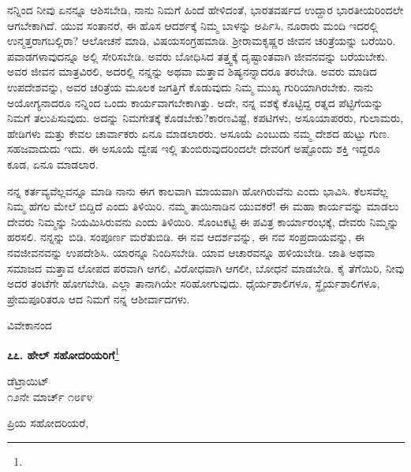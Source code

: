 ನನ್ನಿಂದ ನೀವು ಏನನ್ನೂ ಆಶಿಸಬೇಡಿ, ನಾನು ನಿಮಗೆ ಹಿಂದೆ ಹೇಳಿದಂತೆ, ಭಾರತವರ್ಷದ ಉದ್ದಾರ ಭಾರತೀಯರಿಂದಲೇ ಆಗಬೇಕಾಗಿದೆ. ಯುವ ಸಂತಾನರೆ, ಈ ಹೊಸ ಆದರ್ಶಕ್ಕೆ ನಿಮ್ಮ ಬಾಳನ್ನು ಅರ್ಪಿಸಿ. ನೂರಾರು ಮಂದಿ ಇದರಲ್ಲಿ ಉನ್ಮತ್ತರಾಗಬಲ್ಲಿರಾ? ಆಲೋಚನೆ ಮಾಡಿ, ವಿಷಯಸಂಗ್ರಹಮಾಡಿ. ಶ‍್ರೀರಾಮಕೃಷ್ಣರ ಜೀವನ ಚರಿತ್ರೆಯನ್ನು ಬರೆಯಿರಿ. ಪವಾಡಗಳಾವುದನ್ನೂ ಅಲ್ಲಿ ಸೇರಿಸಬೇಡಿ. ಅವರು ಬೋಧಿಸಿದ ತತ್ತ್ವಕ್ಕೆ ದೃಷ್ಟಾಂತವಾಗಿ ಜೀವನವನ್ನು ಬರೆಯಬೇಕು. ಅವರ ಜೀವನ ಮಾತ್ರವಿರಲಿ, ಅದರಲ್ಲಿ ನನ್ನನ್ನು ಅಥವಾ ಮತ್ತಾವ ಶಿಷ್ಯನನ್ನಾದರೂ ತರಬೇಡಿ. ಅವರು ಮಾಡಿದ ಉಪದೇಶವನ್ನು, ಅವರ ಚರಿತ್ರೆಯ ಮೂಲಕ ಜಗತ್ತಿಗೆ ಕೊಡುವುದು ನಿಮ್ಮ ಮುಖ್ಯ ಗುರಿಯಾಗಿರಬೇಕು. ನಾನು ಅಯೋಗ್ಯನಾದರೂ ನನ್ನಿಂದ ಒಂದು ಕಾರ್ಯವಾಗಬೇಕಾಗಿತ್ತು. ಅದೇ, ನನ್ನ ವಶಕ್ಕೆ ಕೊಟ್ಟಿದ್ದ ರತ್ನದ ಪೆಟ್ಟಿಗೆಯನ್ನು ನಿಮಗೆ ತಲುಪಿಸುವುದು. ಅದನ್ನು ನಿಮಗೇತಕ್ಕೆ ಕೊಡಬೇಕು?ಕಾರಣವಿಷ್ಟೆ, ಕಪಟಿಗಳು, ಅಸೂಯಾಪರರು, ಗುಲಾಮರು, ಹೇಡಿಗಳು ಮತ್ತು ಕೇವಲ ಚಾರ್ವಾಕರು ಏನೂ ಮಾಡಲಾರರು. ಅಸೂಯೆ ಎಂಬುದು ನಮ್ಮ ದೇಶದ ಹುಟ್ಟು ಗುಣ. ಸಹಜವಾದುದು ಇದು. ಈ ಅಸೂಯೆ ದ್ವೇಷ ಇಲ್ಲಿ ತುಂಬಿರುವುದರಿಂದಲೇ ದೇವರಿಗೆ ಅಷ್ಟೊಂದು ಶಕ್ತಿ ಇದ್ದರೂ ಕೂಡ, ಏನೂ ಮಾಡಲಾರ.

\vspace{0.2cm}

ನನ್ನ ಕರ್ತವ್ಯವೆಲ್ಲವನ್ನೂ ಮಾಡಿ ನಾನು ಈಗ ಕಾಲವಾಗಿ ಮಾಯವಾಗಿ ಹೋಗಿರುವೆನು ಎಂದು ಭಾವಿಸಿ. ಕೆಲಸವೆಲ್ಲ ನಿಮ್ಮ ಹೆಗಲ ಮೇಲೆ ಬಿದ್ದಿದೆ ಎಂದು ತಿಳಿಯಿರಿ. ನಮ್ಮ ತಾಯಿನಾಡಿನ ಯುವಕರೆ! ಈ ಮಹಾ ಕಾರ್ಯವನ್ನು ಮಾಡಲು ದೇವರು ನಿಮ್ಮನ್ನು ನಿಯಮಿಸಿರುವನು ಎಂದು ತಿಳಿಯಿರಿ. ಸೊಂಟಕಟ್ಟಿ ಈ ಪವಿತ್ರ ಕಾರ್ಯಾರಂಭಕ್ಕೆ, ದೇವರು ನಿಮ್ಮನ್ನು ಹರಸಲಿ. ನನ್ನನ್ನು ಬಿಡಿ. ಸಂಪೂರ್ಣ ಮರೆತುಬಿಡಿ. ಈ ನವ ಆದರ್ಶವನ್ನು, ಈ ನವ ಸಂಪ್ರದಾಯವನ್ನು, ಈ ನವಜೀವನವನ್ನು ಉಪದೇಶಿಸಿ. ಯಾರನ್ನೂ ನಿಂದಿಸಬೇಡಿ. ಯಾವ ಆಚಾರವನ್ನೂ ಹಳಿಯಬೇಡಿ. ಜಾತಿ ಅಥವಾ ಸಮಾಜದ ಮತ್ತಾವ ಲೋಪದ ಪರವಾಗಿ ಆಗಲಿ, ವಿರೋಧವಾಗಿ ಆಗಲೀ, ಬೋಧನೆ ಮಾಡಬೇಡಿ. ಕೈ ತೆಗೆಯಿರಿ, ನೀವು ಅದರ ತಂಟೆಗೇ ಹೋಗಬೇಡಿ. ಎಲ್ಲಾ ತಾನಾಗಿಯೇ ಸರಿಹೋಗುವುದು. ಧೈರ್ಯಶಾಲಿಗಳೂ, ಸ್ಥೈರ್ಯಶಾಲಿಗಳೂ, ಪ್ರೇಮಪೂರಿತರೂ ಆದ ನಿಮಗೆ ನನ್ನ ಆಶೀರ್ವಾದಗಳು.

\vspace{0.2cm}

{\flushright
ವಿವೇಕಾನಂದ\par}

\newpage

\begin{center}
\textbf{೭೭. ಹೇಲ್ ಸಹೋದರಿಯರಿಗೆ}\footnote{}
\end{center}

\begin{flushright}
ಡೆಟ್ರಾಯಿಟ್\\೧೨ನೇ ಮಾರ್ಚ್ ೧೮೯೪
\end{flushright}

\noindent
ಪ್ರಿಯ ಸಹೋದರಿಯರೆ,

